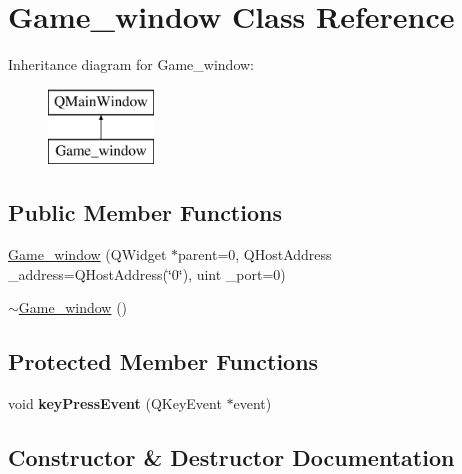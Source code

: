 \hypertarget{class_game__window}{}\section{Game\+\_\+window Class Reference}
\label{class_game__window}
Inheritance diagram for Game\+\_\+window\+:\begin{figure}[H]
\begin{center}
\leavevmode
\includegraphics[height=2.000000cm]{class_game__window}
\end{center}
\end{figure}
\subsection*{Public Member Functions}
\begin{DoxyCompactItemize}
\item 
\mbox{\hyperlink{class_game__window_a48f330b2a2d893f271a2a854e116b54c}{Game\+\_\+window}} (Q\+Widget $\ast$parent=0, Q\+Host\+Address \+\_\+address=Q\+Host\+Address(\char`\"{}0\char`\"{}), uint \+\_\+port=0)
\item 
\mbox{\hyperlink{class_game__window_a5e84f0f55c4526bb0ea3a592c439c16f}{$\sim$\+Game\+\_\+window}} ()
\end{DoxyCompactItemize}
\subsection*{Protected Member Functions}
\begin{DoxyCompactItemize}
\item 
\mbox{\label{class_game__window_a26801612466cd18f629107ed596bb0f1}} 
void {\bfseries key\+Press\+Event} (Q\+Key\+Event $\ast$event)
\end{DoxyCompactItemize}


\subsection{Constructor \& Destructor Documentation}
\mbox{\label{class_game__window_a48f330b2a2d893f271a2a854e116b54c}} 
